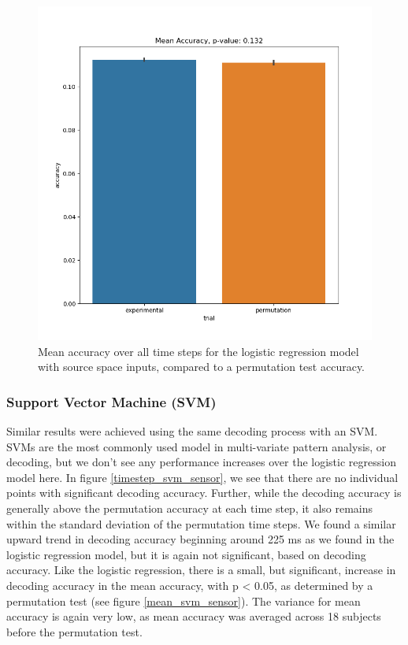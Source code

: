 \documentclass[../main.tex]{subfiles}
\begin{document}
\begin{figure}
    \centering
    \includegraphics[scale=0.7]{figures/results/accuracy_source.png}
    \caption{Mean accuracy over all time steps for the logistic regression model with source space inputs, compared to a permutation test accuracy.}
    \label{mean_acc_logistic_source}
\end{figure}

\subsubsection{Support Vector Machine (SVM)}
Similar results were achieved using the same decoding process with an SVM. SVMs are the most commonly used model in multi-variate pattern analysis, or decoding, but we don't see any performance increases over the logistic regression model here. In figure \ref{timestep_svm_sensor}, we see that there are no individual points with significant decoding accuracy. Further, while the decoding accuracy is generally above the permutation accuracy at each time step, it also remains within the standard deviation of the permutation time steps. We found a similar upward trend in decoding accuracy beginning around 225 ms as we found in the logistic regression model, but it is again not significant, based on decoding accuracy. Like the logistic regression, there is a small, but significant, increase in decoding accuracy in the mean accuracy, with p < 0.05, as determined by a permutation test (see figure \ref{mean_svm_sensor}). The variance for mean accuracy is again very low, as mean accuracy was averaged across 18 subjects before the permutation test.
\end{document}
